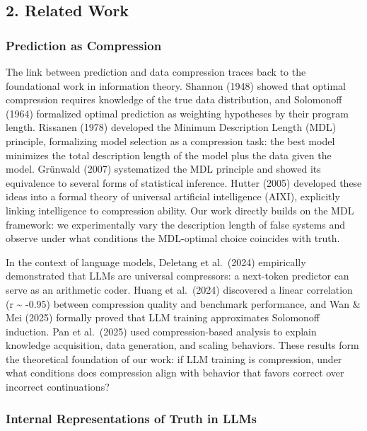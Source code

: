 \documentclass[
  11pt,
]{article}
\begin{document}
\subsection{2. Related Work}\label{related-work}

\subsubsection{Prediction as
Compression}\label{prediction-as-compression}

The link between prediction and data compression traces back to the
foundational work in information theory. Shannon (1948) showed that
optimal compression requires knowledge of the true data distribution,
and Solomonoff (1964) formalized optimal prediction as weighting
hypotheses by their program length. Rissanen (1978) developed the
Minimum Description Length (MDL) principle, formalizing model selection
as a compression task: the best model minimizes the total description
length of the model plus the data given the model. Grünwald (2007)
systematized the MDL principle and showed its equivalence to several
forms of statistical inference. Hutter (2005) developed these ideas into
a formal theory of universal artificial intelligence (AIXI), explicitly
linking intelligence to compression ability. Our work directly builds on
the MDL framework: we experimentally vary the description length of
false systems and observe under what conditions the MDL-optimal choice
coincides with truth.

In the context of language models, Deletang et al.~(2024) empirically
demonstrated that LLMs are universal compressors: a next-token predictor
can serve as an arithmetic coder. Huang et al.~(2024) discovered a
linear correlation (r \textasciitilde{} -0.95) between compression
quality and benchmark performance, and Wan \& Mei (2025) formally proved
that LLM training approximates Solomonoff induction. Pan et al.~(2025)
used compression-based analysis to explain knowledge acquisition, data
generation, and scaling behaviors. These results form the theoretical
foundation of our work: if LLM training is compression, under what
conditions does compression align with behavior that favors correct over
incorrect continuations?

\subsubsection{Internal Representations of Truth in
LLMs}\label{internal-representations-of-truth-in-llms}
\end{document}
